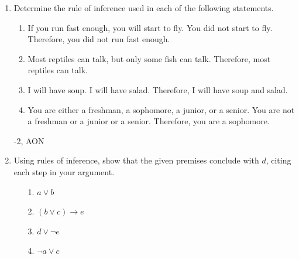 \begin{enumerate}

















    
\item Determine the rule of inference used in each of the following statements. 
\begin{enumerate}
    \item If you run fast enough, you will start to fly. You did not start to fly. Therefore, you did not run fast enough.
    \item Most reptiles can talk, but only some fish can talk. Therefore, most reptiles can talk.
    \item I will have soup. I will have salad. Therefore, I will have soup and salad.
    \item You are either a freshman, a sophomore, a junior, or a senior. You are not a freshman or a junior or a senior. Therefore, you are a sophomore.
\end{enumerate}

\begin{rubric}
-2, AON
\end{rubric}

\item Using rules of inference, show that the given premises conclude with $d$, citing each step in your argument. 

\begin{enumerate}
    \item[1.] $a \lor b$
    \item[2.] $(b \lor c) \rightarrow e$
    \item[3.] $d \lor \neg e$
    \item[4.] $\neg a \lor c$
\end{enumerate}


\end{enumerate}
